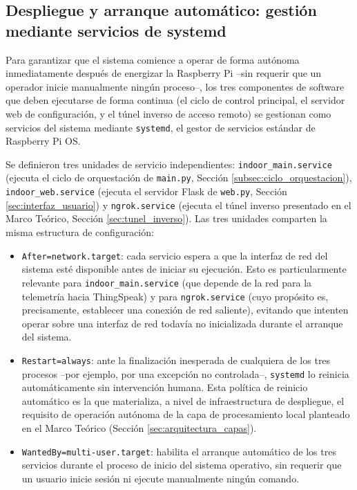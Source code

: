 \subsection{Despliegue y arranque automático: gestión mediante servicios de systemd}
\label{subsec:systemd}

Para garantizar que el sistema comience a operar de forma autónoma inmediatamente después de energizar la Raspberry Pi --sin requerir que un operador inicie manualmente ningún proceso--, los tres componentes de software que deben ejecutarse de forma continua (el ciclo de control principal, el servidor web de configuración, y el túnel inverso de acceso remoto) se gestionan como servicios del sistema mediante \texttt{systemd}, el gestor de servicios estándar de Raspberry Pi OS.

Se definieron tres unidades de servicio independientes: \texttt{indoor\_main.service} (ejecuta el ciclo de orquestación de \texttt{main.py}, Sección \ref{subsec:ciclo_orquestacion}), \texttt{indoor\_web.service} (ejecuta el servidor Flask de \texttt{web.py}, Sección \ref{sec:interfaz_usuario}) y \texttt{ngrok.service} (ejecuta el túnel inverso presentado en el Marco Teórico, Sección \ref{sec:tunel_inverso}). Las tres unidades comparten la misma estructura de configuración:

\begin{itemize}
    \item \texttt{After=network.target}: cada servicio espera a que la interfaz de red del sistema esté disponible antes de iniciar su ejecución. Esto es particularmente relevante para \texttt{indoor\_main.service} (que depende de la red para la telemetría hacia ThingSpeak) y para \texttt{ngrok.service} (cuyo propósito es, precisamente, establecer una conexión de red saliente), evitando que intenten operar sobre una interfaz de red todavía no inicializada durante el arranque del sistema.
    \item \texttt{Restart=always}: ante la finalización inesperada de cualquiera de los tres procesos --por ejemplo, por una excepción no controlada--, \texttt{systemd} lo reinicia automáticamente sin intervención humana. Esta política de reinicio automático es la que materializa, a nivel de infraestructura de despliegue, el requisito de operación autónoma de la capa de procesamiento local planteado en el Marco Teórico (Sección \ref{sec:arquitectura_capas}).
    \item \texttt{WantedBy=multi-user.target}: habilita el arranque automático de los tres servicios durante el proceso de inicio del sistema operativo, sin requerir que un usuario inicie sesión ni ejecute manualmente ningún comando.
\end{itemize}


